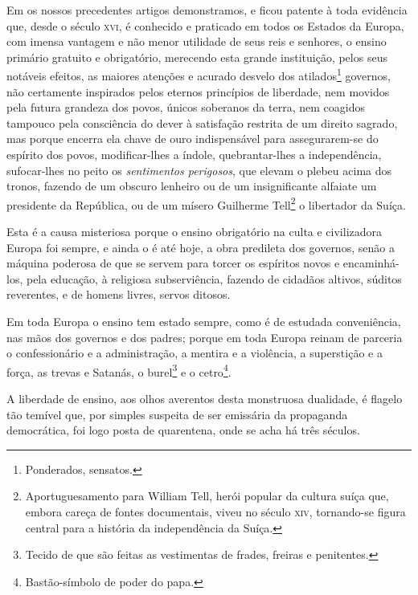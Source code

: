 Em os nossos precedentes artigos demonstramos, e ficou patente à toda
evidência que, desde o século \textsc{xvi}, é conhecido e praticado em todos os
Estados da Europa, com imensa vantagem e não menor utilidade de seus
reis e senhores, o ensino primário gratuito e obrigatório, merecendo
esta grande instituição, pelos seus notáveis efeitos, as maiores
atenções e acurado desvelo dos atilados\footnote{Ponderados, sensatos.}
governos, não certamente inspirados pelos eternos princípios de
liberdade, nem movidos pela futura grandeza dos povos, únicos soberanos
da terra, nem coagidos tampouco pela consciência do dever à satisfação
restrita de um direito sagrado, mas porque encerra ela chave de ouro
indispensável para assegurarem-se do espírito dos povos, modificar-lhes
a índole, quebrantar-lhes a independência, sufocar-lhes no peito os
\emph{sentimentos perigosos}, que elevam o plebeu acima dos tronos,
fazendo de um obscuro lenheiro ou de um insignificante alfaiate um
presidente da República, ou de um mísero Guilherme Tell\footnote{
  Aportuguesamento para William Tell, herói popular da cultura suíça
  que, embora careça de fontes documentais, viveu no século \textsc{xiv},
  tornando-se figura central para a história da independência da Suíça.}
o libertador da Suíça.

Esta é a causa misteriosa porque o ensino obrigatório na culta e
civilizadora Europa foi sempre, e ainda o é até hoje, a obra predileta
dos governos, senão a máquina poderosa de que se servem para torcer os
espíritos novos e encaminhá-los, pela educação, à religiosa
subserviência, fazendo de cidadãos altivos, súditos reverentes, e de
homens livres, servos ditosos.

Em toda Europa o ensino tem estado sempre, como é de estudada
conveniência, nas mãos dos governos e dos padres; porque em toda Europa
reinam de parceria o confessionário e a administração, a mentira e a
violência, a superstição e a força, as trevas e Satanás, o
burel\footnote{Tecido de que são feitas as vestimentas de frades,
  freiras e penitentes.} e o cetro\footnote{Bastão-símbolo de poder do
  papa.}.

A liberdade de ensino, aos olhos averentos desta monstruosa dualidade, é
flagelo tão temível que, por simples suspeita de ser emissária da
propaganda democrática, foi logo posta de quarentena, onde se acha há
três séculos.

